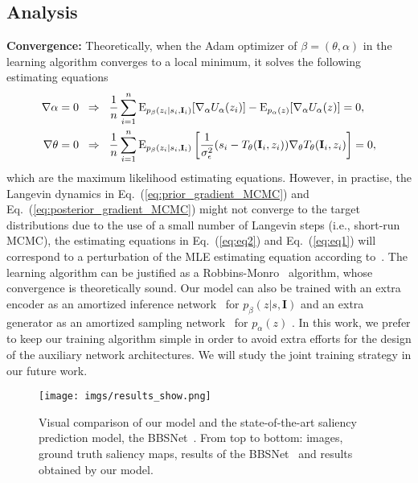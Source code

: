 \documentclass{article}
\begin{document}
\subsection{Analysis}


\noindent\textbf{Convergence:} Theoretically, when the Adam optimizer of $\beta=(\theta,\alpha)$ in the learning algorithm converges to a local minimum, it solves the following estimating equations
\begin{align}
\nabla{\alpha}=0  \hspace{2mm} &\Rightarrow  \hspace{2mm} \frac{1}{n}\sum_{i=1}^{n}\text{E}_{p_{\beta}(z_i|s_i,\textbf{I}_i)}[\nabla_{\alpha} U_{\alpha}(z_i)]-\text{E}_{p_{\alpha}(z)}[\nabla_{\alpha} U_{\alpha}(z)]=0, \label{eq:eq2} \\
\nabla{\theta}=0 \hspace{2mm} &\Rightarrow  \hspace{2mm} \frac{1}{n}\sum_{i=1}^{n}\text{E}_{p_{\beta}(z_i|s_i,\textbf{I}_i)}\left[\frac{1}{\sigma_{\epsilon}^2}(s_i-T_{\theta}(\textbf{I}_i,z_i)) \nabla_{\theta} T_{\theta}(\textbf{I}_i,z_i)\right]=0, \label{eq:eq1} 
\end{align}
which are the maximum likelihood estimating equations. However, in practise, the Langevin dynamics in Eq.~(\ref{eq:prior_gradient_MCMC}) and Eq.~(\ref{eq:posterior_gradient_MCMC}) might not converge to the target distributions due to the use of a small number of Langevin steps (i.e., short-run MCMC), the estimating equations in Eq.~(\ref{eq:eq2}) and Eq.~(\ref{eq:eq1}) will correspond to a perturbation of the MLE estimating equation according to~\cite{nijkamp2019learning,nijkamp2020learning,ebm_prior}. The learning algorithm can be justified as a Robbins-Monro~\cite{robbins1951stochastic} algorithm, whose convergence is theoretically sound. Our model can also be trained with an extra encoder as an amortized inference network~\cite{vae_bayes_kumar} for $p_{\beta}(z|s,\textbf{I})$  and an extra generator as an amortized sampling network~\cite{XieLGW18,xie2018cooperative,XieZL21} for $p_{\alpha}(z)$ . In this work, we prefer to keep our training algorithm simple in order to avoid extra efforts for the design of the auxiliary network architectures. We will study the joint training strategy in our future work.

 \begin{figure*}[t]
   \begin{center}
   \texttt{[image: imgs/results\_show.png]}
   \end{center}
   \caption{Visual comparison of our  model and the state-of-the-art saliency prediction model, the BBSNet~\cite{fan2020bbs}. From top to bottom: images, ground truth saliency maps, results of the BBSNet~\cite{fan2020bbs} and results obtained by our model.
   }\label{fig:visual_comparison}
\end{figure*}
\end{document}
